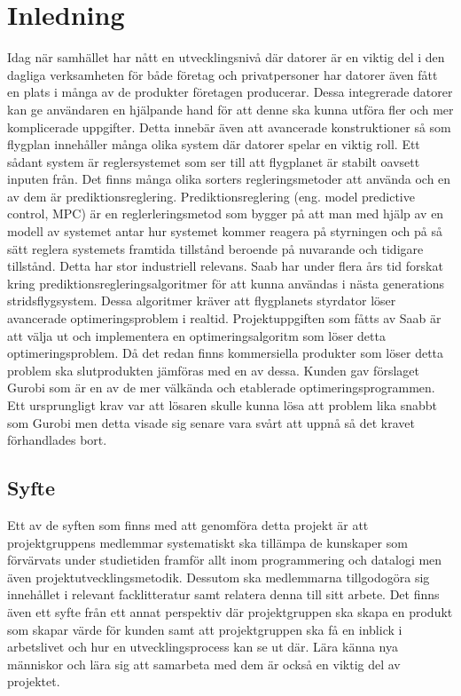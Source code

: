 \section{Inledning}
Idag när samhället har nått en utvecklingsnivå där datorer är en viktig del i den dagliga verksamheten för både företag och privatpersoner har datorer även fått en plats i många av de produkter företagen producerar. Dessa integrerade datorer kan ge användaren en hjälpande hand för att denne ska kunna utföra fler och mer komplicerade uppgifter. Detta innebär även att avancerade konstruktioner så som flygplan innehåller många olika system där datorer spelar en viktig roll. Ett sådant system är reglersystemet som ser till att flygplanet är stabilt oavsett inputen från. Det finns många olika sorters regleringsmetoder att använda och en av dem är prediktionsreglering. 
\newline
\newline
Prediktionsreglering (eng. model predictive control, MPC) är en reglerleringsmetod som 
bygger på att man med hjälp av en modell av systemet antar hur systemet kommer reagera på styrningen och på så sätt reglera systemets framtida tillstånd beroende på nuvarande och tidigare tillstånd. Detta har stor industriell relevans.\citep[2]{ir}
\newline
\newline
Saab har under flera års tid forskat kring prediktionsregleringsalgoritmer för att kunna användas i nästa generations stridsflygsystem. Dessa algoritmer kräver att flygplanets styrdator löser avancerade optimeringsproblem i realtid.
\newline
\newline
Projektuppgiften som fåtts av Saab är att välja ut och implementera en optimeringsalgoritm som löser detta optimeringsproblem. Då det redan finns kommersiella produkter som löser detta problem ska slutprodukten jämföras med en av dessa. Kunden gav förslaget Gurobi som är en av de mer välkända och etablerade optimeringsprogrammen. Ett ursprungligt krav var att lösaren skulle kunna lösa att problem lika snabbt som Gurobi men detta visade sig senare vara svårt att uppnå så det kravet förhandlades bort. 

\subsection{Syfte}
Ett av de syften som finns med att genomföra detta projekt är att projektgruppens medlemmar systematiskt ska tillämpa de kunskaper som förvärvats under studietiden framför allt inom programmering och datalogi men även projektutvecklingsmetodik. Dessutom ska medlemmarna tillgodogöra sig innehållet i relevant facklitteratur samt relatera denna till sitt arbete. 
Det finns även ett syfte från ett annat perspektiv där projektgruppen ska skapa en produkt som skapar värde för kunden samt att projektgruppen ska få en inblick i arbetslivet och hur en utvecklingsprocess kan se ut där. Lära känna nya människor och lära sig att samarbeta med dem är också en viktig del av projektet. 

